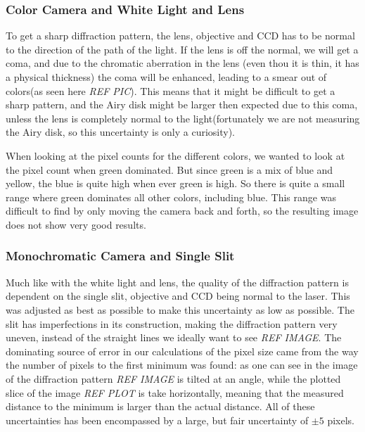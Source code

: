 \documentclass{emulateapj}
\begin{document}
\subsubsection{Color Camera and White Light and Lens}
\label{sec:uncWhiteLight}
To get a sharp diffraction pattern, the lens, objective and CCD has to be normal to the direction of the path of the light. If the lens is off the normal, we will get a coma, and due to the chromatic aberration in the lens (even thou it is thin, it has a physical thickness) the coma will be enhanced, leading to a smear out of colors(as seen here \emph{REF PIC}). This means that it might be difficult to get a sharp pattern, and the Airy disk might be larger then expected due to this coma, unless the lens is completely normal to the light(fortunately we are not measuring the Airy disk, so this uncertainty is only a curiosity).

When looking at the pixel counts for the different colors, we wanted to look at the pixel count when green dominated. But since green is a mix of blue and yellow, the blue is quite high when ever green is high. So there is quite a small range where green dominates all other colors, including blue. This range was difficult to find by only moving the camera back and forth, so the resulting image does not show very good results.

\subsubsection{Monochromatic Camera and Single Slit}
\label{sec:uncSlit}

Much like with the white light and lens, the quality of the diffraction pattern is dependent on the single slit, objective and CCD being normal to the laser. This was adjusted as best as possible to make this uncertainty as low as possible.
The slit has imperfections in its construction, making the diffraction pattern very uneven, instead of the straight lines we ideally want to see \emph{REF IMAGE}.
The dominating source of error in our calculations of the pixel size came from the way the number of pixels to the first minimum was found: as one can see in the image of the diffraction pattern \emph{REF IMAGE} is tilted at an angle, while the plotted slice of the image \emph{REF PLOT} is take horizontally, meaning that the measured distance to the minimum is larger than the actual distance.
All of these uncertainties has been encompassed by a large, but fair uncertainty of $\pm 5$ pixels. 
\end{document}
